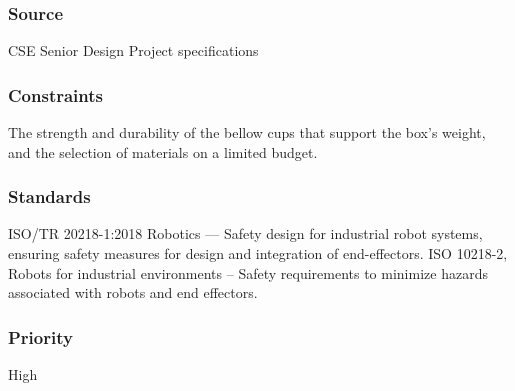 \subsubsection{Source}
CSE Senior Design Project specifications
\subsubsection{Constraints}
The strength and durability of the bellow cups that support the box's weight, and the selection of materials on a limited budget.
\subsubsection{Standards}
ISO/TR 20218-1:2018 Robotics — Safety design for industrial robot systems, ensuring safety measures for design and integration of end-effectors.
ISO 10218-2, Robots for industrial environments – Safety requirements to minimize hazards associated with robots and end effectors.
\subsubsection{Priority}
High
